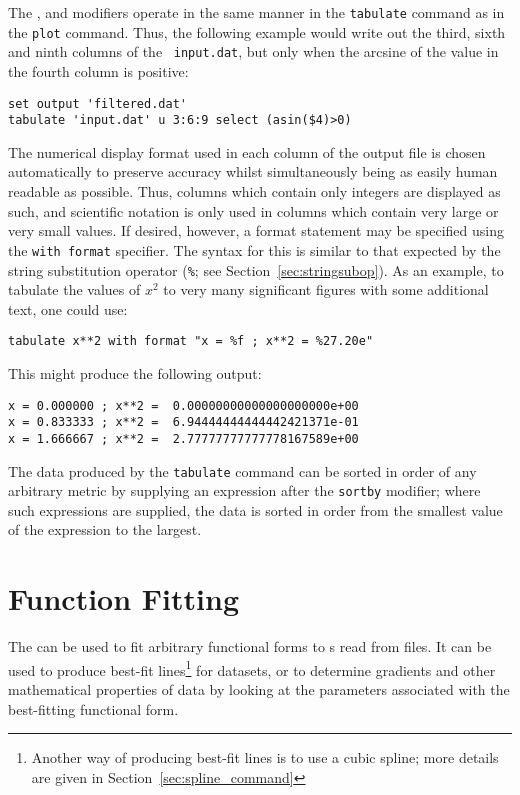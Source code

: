 The ,  and  modifiers operate in
the same manner in the {\tt tabulate} command as in the {\tt plot} command.
Thus, the following example would write out the third, sixth and ninth columns
of the \datafile\ {\tt input.dat}, but only when the arcsine of the value in the
fourth column is positive:

\begin{verbatim}
set output 'filtered.dat'
tabulate 'input.dat' u 3:6:9 select (asin($4)>0)
\end{verbatim}

The numerical display format used in each column of the output file is chosen
automatically to preserve accuracy whilst simultaneously being as easily human
readable as possible.  Thus, columns which contain only integers are displayed
as such, and scientific notation is only used in columns which contain very
large or very small values.  If desired, however, a format statement may be
specified using the {\tt with format} specifier. The syntax for this is similar
to that expected by the string substitution operator ({\tt \%}; see
Section~\ref{sec:stringsubop}). As an example, to tabulate the values of $x^2$
to very many significant figures with some additional text, one could use:

\begin{verbatim}
tabulate x**2 with format "x = %f ; x**2 = %27.20e"
\end{verbatim}

\noindent This might produce the following output:

\begin{verbatim}
x = 0.000000 ; x**2 =  0.00000000000000000000e+00
x = 0.833333 ; x**2 =  6.94444444444442421371e-01
x = 1.666667 ; x**2 =  2.77777777777778167589e+00
\end{verbatim}

The data produced by the {\tt tabulate} command can be sorted in order of any
arbitrary metric by supplying an expression after the {\tt sortby} modifier;
where such expressions are supplied, the data is sorted in order from the
smallest value of the expression to the largest.


\section{Function Fitting}
\label{sec:fit_command}

The  can be used to fit arbitrary functional forms to \datapoint s
read from files. It can be used to produce best-fit lines\footnote{Another way of producing best-fit lines is to use a cubic
spline; more details are given in Section~\ref{sec:spline_command}} for
datasets, or to determine gradients and other mathematical properties of data
by looking at the parameters associated with the best-fitting functional form.

